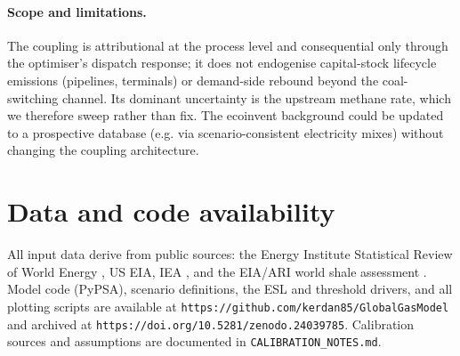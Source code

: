 \documentclass[11pt]{article}
\begin{document}
\paragraph{Scope and limitations.} The coupling is attributional at the process
level and consequential only through the optimiser's dispatch response; it does
not endogenise capital-stock lifecycle emissions (pipelines, terminals) or
demand-side rebound beyond the coal-switching channel. Its dominant uncertainty
is the upstream methane rate, which we therefore sweep rather than fix. The
ecoinvent background could be updated to a prospective database (e.g. via
scenario-consistent electricity mixes) without changing the coupling
architecture.

\section{Data and code availability}\label{si:data}

All input data derive from public sources: the Energy Institute Statistical
Review of World Energy \citep{EI2024}, US EIA, IEA \citep{iea_methane_2024},
and the EIA/ARI world shale assessment \citep{EIA_ARI2013}. Model code
(PyPSA), scenario definitions, the ESL and threshold drivers, and all
plotting scripts are available at
\texttt{https://github.com/kerdan85/GlobalGasModel} and archived at
\texttt{https://doi.org/10.5281/zenodo.24039785}. Calibration sources
and assumptions are documented in \texttt{CALIBRATION\_NOTES.md}.



\end{document}

